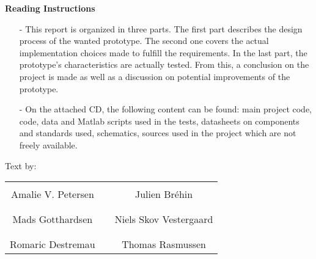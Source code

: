 \textbf{Reading Instructions}
\vspace{-10 pt}
\begin{itemize}
\item[-] This report is organized in three parts. The first part describes the design process of the wanted prototype. The second one covers the actual implementation choices made to fulfill the requirements. In the last part, the prototype's characteristics are actually tested. From this, a conclusion on the project is made as well as a discussion on potential improvements of the prototype.
\item[-] On the attached CD, the following content can be found: main project code, code, data and Matlab scripts used in the tests, datasheets on components and standards used, schematics, sources used in the project which are not freely available.
\end{itemize}
%
Text by:\\
\vspace{-12 pt}
\begin{table}[H]
	\centering
		\begin{tabular}{c c c}
			\underline{\phantom{JAERJAERJAERJAERGO}} & \phantom{cookies} & \underline{\phantom{JAERJAERJAERJAERGO}} \\
			Amalie V. Petersen			& \phantom{cookies} & Julien Br\'ehin		\\
			&&\\
			\underline{\phantom{JAERJAERJAERJAERGO}} & \phantom{cookies} & \underline{\phantom{JAERJAERJAERJAERGO}} \\
			Mads Gotthardsen			& \phantom{cookies} & Niels Skov Vestergaard		\\
			&&\\
	    	\underline{\phantom{JAERJAERJAERJAERGO}} & \phantom{cookies} & \underline{\phantom{JAERJAERJAERJAERGO}} \\
			Romaric Destremau 					& \phantom{cookies} & Thomas Rasmussen 			\\			
		\end{tabular}
\end{table}